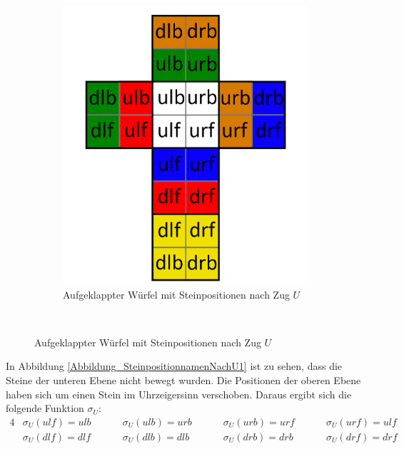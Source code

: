 \documentclass[12pt,a4paper, usenames, dvipsnames]{article}
\theoremstyle{mystyle}
\theoremstyle{definition}
\begin{document}
\begin{figure}[h]
\begin{minipage}[b][][b]{0.43\textwidth}
\begin{figure}[H]
\centering
\includegraphics[scale=0.15]{foldedout_spin.png}
\caption[Aufgeklappter Würfel mit Namen der Steinpositionen nach Zug $U$]{Aufgeklappter Würfel mit Steinpositionen nach Zug $U$}
\label{Abbildung_SteinpositionnamenNachU2}
\end{figure}

\end{minipage}\begin{minipage}[b][][b]{0.04\textwidth}$\ $ \end{minipage}
\end{figure}

In Abbildung \ref{Abbildung_SteinpositionnamenNachU1} ist zu sehen, dass die Steine der unteren Ebene nicht bewegt wurden. Die Positionen der oberen Ebene haben sich um einen Stein im Uhrzeigersinn verschoben. Daraus ergibt sich die folgende Funktion $\sigma_U$:
\begin{alignat*}{4}
& \sigma_U(\textit{ulf})=\textit{ulb} \ \ \ \ \ \ \ && \sigma_U(\textit{ulb})=\textit{urb} \ \ \ \ \ \ \ && \sigma_U(\textit{urb})=\textit{urf} \ \ \ \ \ \ \ && \sigma_U(\textit{urf})=\textit{ulf} \\
& \sigma_U(\textit{dlf})=\textit{dlf} \ \ \ \ \ \ \ && \sigma_U(\textit{dlb})=\textit{dlb} \ \ \ \ \ \ \ && \sigma_U(\textit{drb})=\textit{drb} \ \ \ \ \ \ \ && \sigma_U(\textit{drf})=\textit{drf} 
\end{alignat*}
\end{document}
